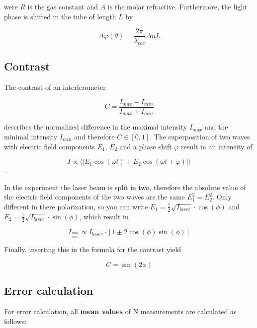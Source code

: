 were $R$ is the gas constant and $A$ is the molar refractive.
Furthermore, the light phase is shifted in the tube of length $L$ by

\begin{equation}
    \Delta \varphi(\theta ) =\frac{2\pi }{\lambda_{vac}}\Delta n L
\end{equation}

\subsection{Contrast}
The contrast of an interferometer 

\begin{equation}
    C=\frac{I_{max}-I_{min}}{I_{max}+I_{min}}
\end{equation}

describes the normalized difference in the maximal intensity $I_{max}$ and the minimal intensity $I_{min}$ and therefore $C \in [0,1] $.
The superposition of two waves with electric field components $E_1$, $E_2$ and a phase shift $\varphi $ result in an intensity of

\begin{equation}
    I\varpropto \langle |E_1 \cos(\omega t) + E_2 \cos(\omega t+\varphi ) | \rangle 
\end{equation}.

In the experiment the laser beam is split in two, therefore the absolute value of the electric field components of the two waves are the same $E_1^2=E_2^2$.
Only different in there polarization, so you can write $E_1=\frac{1}{2} \sqrt{I_{laser}} \cdot \cos(\phi )$ and $E_2=\frac{1}{2} \sqrt{I_{laser}} \cdot \sin(\phi )$, 
which result in 

\begin{equation}
    I_{\frac{max}{min}}\varpropto I_{laser}\cdot [1\pm 2\cos(\phi )\sin(\phi )]
\end{equation}

Finally, inserting this in the formula for the contrast yield

\begin{equation}
    C=\sin(2\phi )
\end{equation}


\subsection{Error calculation}
For error calculation, all \textbf{mean values} of N measurements are calculated as follows:


